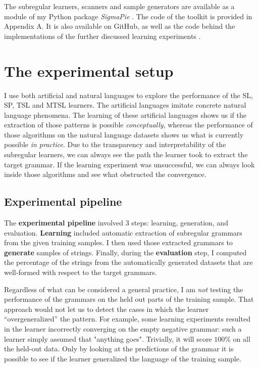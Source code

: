 The subregular learners, scanners and sample generators are available as a module of my Python package \emph{SigmaPie} \href{https://pypi.org/project/SigmaPie/}{\faCube} \citep{sigmapie}.
The code of the toolkit is provided in Appendix A.
It is also available on GitHub, as well as the code behind the implementations of the further discussed learning experiments \href{https://github.com/alenaks/subregular-experiments}{\faGithub} \citep{GHsubex}.


\section{The experimental setup}

I use both artificial and natural languages to explore the performance of the SL, SP, TSL and MTSL learners.
The artificial languages imitate concrete natural language phenomena.
The learning of these artificial languages shows us if the extraction of those patterns is possible \emph{conceptually}, whereas the performance of those algorithms on the natural language datasets shows us what is currently possible \emph{in practice}.
Due to the transparency and interpretability of the subregular learners, we can always see the path the learner took to extract the target grammar.
If the learning experiment was unsuccessful, we can always look inside those algorithms and see what obstructed the convergence.

\subsection{Experimental pipeline}

The \textbf{experimental pipeline} involved $3$ steps: learning, generation, and evaluation.
\textbf{Learning} included automatic extraction of subregular grammars from the given training samples.
I then used those extracted grammars to \textbf{generate} samples of strings.
Finally, during the \textbf{evaluation} step, I computed the percentage of the strings from the automatically generated datasets that are well-formed with respect to the target grammars.

Regardless of what can be considered a general practice, I am \emph{not} testing the performance of the grammars on the held out parts of the training sample.
That approach would not let us to detect the cases in which the learner ``overgeneralized'' the pattern.
For example, some learning experiments resulted in the learner incorrectly converging on the empty negative grammar: such a learner simply assumed that "anything goes".
Trivially, it will score $100$\% on all the held-out data.
Only by looking at the predictions of the grammar it is possible to see if the learner generalized the language of the training sample.

